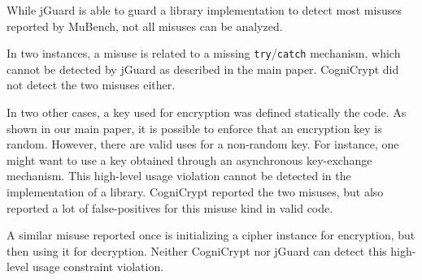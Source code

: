 \documentclass{article}
\begin{document}
While jGuard is able to guard a library implementation to detect most misuses reported by MuBench,
not all misuses can be analyzed.

In two instances, a misuse is related to a missing \texttt{try}/\texttt{catch} mechanism,
which cannot be detected by jGuard as described in the main paper.
CogniCrypt did not detect the two misuses either.

In two other cases, a key used for encryption was defined statically the code.
As shown in our main paper, it is possible to enforce that an encryption key
is random.
However, there are valid uses for a non-random key. For instance, one might want to use a key obtained
through an asynchronous key-exchange mechanism.
This high-level usage violation cannot be detected in the implementation of a library.
CogniCrypt reported the two misuses, but also reported a lot of false-positives for
this misuse kind in valid code.

A similar misuse reported once is initializing a cipher instance for encryption, but then using it for
decryption.
Neither CogniCrypt nor jGuard can detect this high-level usage constraint violation.
\end{document}
